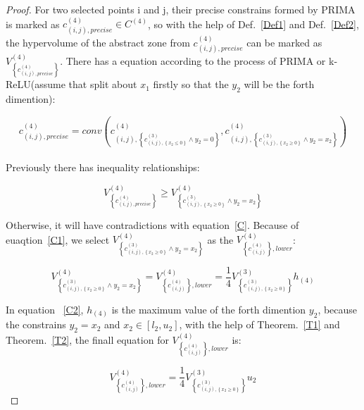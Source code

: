 \documentclass[runningheads]{llncs}
\begin{document}
\begin{proof}
For two selected points i and j, their precise constrains formed by PRIMA is marked as $c_{\left ( i,j\right ),precise}^{(4)}\in C^{(4)}$, so with the help of Def.~\ref{Def1} and Def.~\ref{Def2}, the hypervolume of the abstract zone from $c_{\left ( i,j\right ),precise}^{(4)}$ can be marked as $V^{(4)}_{\left \{c_{\left ( i,j\right ),precise}^{(4)}\right \}}$. There has a equation according to the process of PRIMA or k-ReLU(assume that split about $x_{1}$ firstly so that the $y_{2}$ will be the forth dimention):

\begin{equation}\label{C}
c_{\left ( i,j\right ),precise}^{(4)} = conv(c_{\left ( i,j\right ),\left \{ c^{(3)}_{\left ( i,j\right ),\left \{x_{2}\leq 0\right \}}\wedge y_{2}=0\right \}}^{(4)}, c_{\left ( i,j\right ),\left \{ c^{(3)}_{\left ( i,j\right ),\left \{x_{2}\geq 0\right \}}\wedge y_{2}=x_{2}\right \}}^{(4)})
\end{equation}\\

Previously there has inequality relationships:

\begin{equation}\label{C1}
V^{(4)}_{\left \{c_{\left ( i,j\right ),precise}^{(4)}\right \}} \geq V^{(4)}_{\left \{ c^{(3)}_{\left ( i,j\right ),\left \{x_{2}\geq 0\right \}}\wedge y_{2}=x_{2}\right \}}
\end{equation}

Otherwise, it will have contradictions with equation~\ref{C}.
Because of euaqtion~\ref{C1}, we select $V^{(4)}_{\left \{ c^{(3)}_{\left ( i,j\right ),\left \{x_{2}\geq 0\right \}}\wedge y_{2}=x_{2}\right \}}$ as the $V_{\left \{c_{(i,j)}^{(4)} \right \},lower}^{(4)}$:

\begin{equation}\label{C2}
V^{(4)}_{\left \{ c^{(3)}_{\left ( i,j\right ),\left \{x_{2}\geq 0\right \}}\wedge y_{2}=x_{2}\right \}}=V_{\left \{c_{(i,j)}^{(4)} \right \},lower}^{(4)}=\frac{1}{4}V^{(3)}_{\left \{c^{(3)}_{\left ( i,j\right ),\left \{x_{2}\geq 0\right \}}\right \}}h_{(4)}
\end{equation}

In equation ~\ref{C2}, $h_{(4)}$ is the maximum value of the forth dimention $y_{2}$, because the constrains $y_{2}=x_{2}$ and $x_{2}\in \left [ l_{2},u_{2}\right ]$, with the help of Theorem.~\ref{T1} and Theorem.~\ref{T2}, the finall equation for $V_{\left \{c_{(i,j)}^{(4)} \right \},lower}^{(4)}$ is:

\begin{equation}\label{C3}
V_{\left \{c_{(i,j)}^{(4)} \right \},lower}^{(4)}=\frac{1}{4}V^{(3)}_{\left \{c^{(3)}_{\left ( i,j\right ),\left \{x_{2}\geq 0\right \}}\right \}}u_{2}
\end{equation}

\end{proof}
\end{document}
